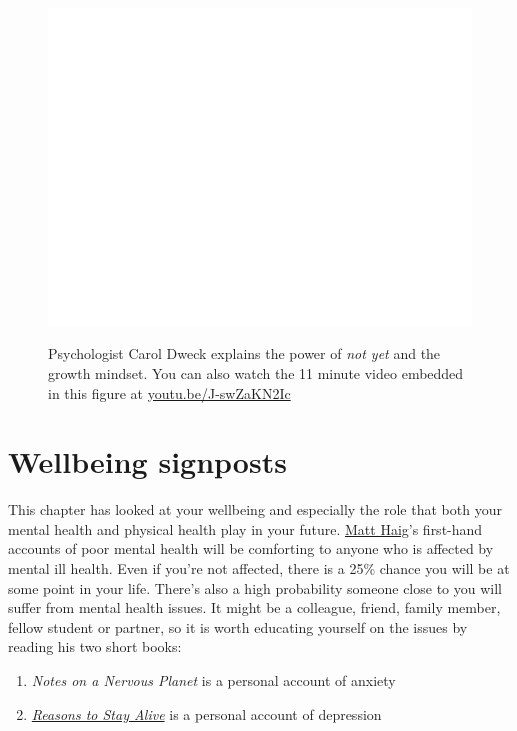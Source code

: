 \documentclass[
]{book}
\providecommand{\tightlist}{%
  \setlength{\itemsep}{0pt}\setlength{\parskip}{0pt}}
\begin{document}
\begin{figure}

{\centering \href{https://www.youtube.com/embed/J-swZaKN2Ic}{\includegraphics[width=0.99\linewidth]{cdyf_files/figure-latex/not-fig-1} }

}

\caption{Psychologist Carol Dweck explains the power of \emph{not yet} and the growth mindset. You can also watch the 11 minute video embedded in this figure at \href{https://youtu.be/J-swZaKN2Ic}{youtu.be/J-swZaKN2Ic} \citep{youtube-dweck}}\label{fig:not-fig}
\end{figure}



\hypertarget{signposts3}{%
\section{Wellbeing signposts}\label{signposts3}}

This chapter has looked at your wellbeing and especially the role that both your mental health and physical health play in your future. \href{https://en.wikipedia.org/wiki/Matt_Haig}{Matt Haig}'s first-hand accounts of poor mental health will be comforting to anyone who is affected by mental ill health. Even if you're not affected, there is a 25\% chance you will be at some point in your life. There's also a high probability someone close to you will suffer from mental health issues. It might be a colleague, friend, family member, fellow student or partner, so it is worth educating yourself on the issues by reading his two short books:

\begin{enumerate}
\def\labelenumi{\arabic{enumi}.}
\tightlist
\item
  \emph{Notes on a Nervous Planet} is a personal account of anxiety \citep{nervousplanet}
\item
  \emph{\href{https://en.wikipedia.org/wiki/Reasons_to_Stay_Alive}{Reasons to Stay Alive}} is a personal account of depression \citep{stayalive}
\end{enumerate}
\end{document}
